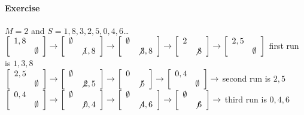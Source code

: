 \documentclass[10pt]{report}
\begin{document}
\paragraph{Exercise} $M = 2$ and $S = 1, 8, 3, 2, 5, 0, 4, 6$\ldots\\
$\left[\begin{array}{l r}
1,8&\\
&\emptyset
\end{array}\right]\rightarrow\left[\begin{array}{l r}
\emptyset&\\
&\not1,8
\end{array}\right]\rightarrow\left[\begin{array}{l r}
\emptyset&\\
&\not3,8
\end{array}\right]\rightarrow\left[\begin{array}{l r}
2&\\
&\not8
\end{array}\right]\rightarrow\left[\begin{array}{l r}
2,5&\\
&\emptyset
\end{array}\right]$ first run is $1,3,8$\\
$\left[\begin{array}{l r}
2,5&\\
&\emptyset
\end{array}\right]\rightarrow\left[\begin{array}{l r}
\emptyset&\\
&\not2,5
\end{array}\right]\rightarrow\left[\begin{array}{l r}
0&\\
&\not5
\end{array}\right]\rightarrow\left[\begin{array}{l r}
0,4&\\
&\emptyset
\end{array}\right]\rightarrow$ second run is $2,5$\\
$\left[\begin{array}{l r}
0,4&\\
&\emptyset
\end{array}\right]\rightarrow\left[\begin{array}{l r}
\emptyset&\\
&\not0, 4
\end{array}\right]\rightarrow\left[\begin{array}{l r}
\emptyset&\\
&\not4, 6
\end{array}\right]\rightarrow\left[\begin{array}{l r}
\emptyset&\\
&\not6
\end{array}\right]\rightarrow$ third run is $0,4,6$
\end{document}

